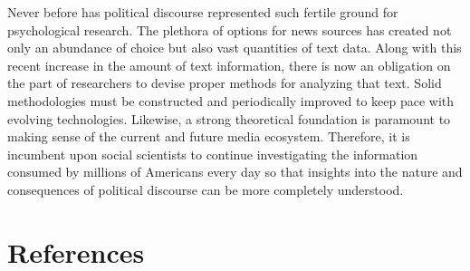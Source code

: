 \documentclass[
  man,floatsintext]{apa6}
\begin{document}
Never before has political discourse represented such fertile ground for
psychological research. The plethora of options for news sources has
created not only an abundance of choice but also vast quantities of text
data. Along with this recent increase in the amount of text information,
there is now an obligation on the part of researchers to devise proper
methods for analyzing that text. Solid methodologies must be constructed
and periodically improved to keep pace with evolving technologies.
Likewise, a strong theoretical foundation is paramount to making sense
of the current and future media ecosystem. Therefore, it is incumbent
upon social scientists to continue investigating the information
consumed by millions of Americans every day so that insights into the
nature and consequences of political discourse can be more completely
understood.

\newpage

\section{References}\label{references}
\end{document}
